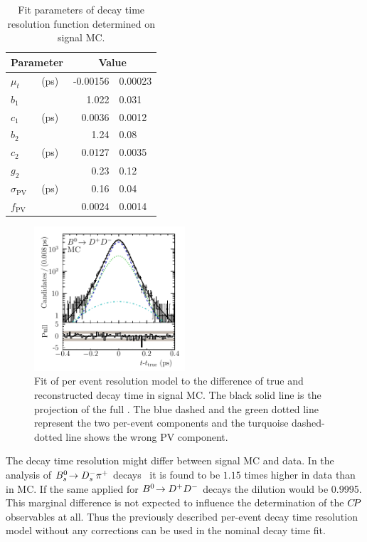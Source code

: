 \begin{table}[!htb]
\centering
\caption{Fit parameters of decay time resolution function determined on \BdToDD signal MC.}
  \begin{tabular}{llr@{$\,\pm\,$}l}
    \toprule
    \multicolumn{2}{c}{Parameter}       &   \multicolumn{2}{c}{Value} \\
    \midrule
    $\mu_t$             &   (\si{\ps})  &   -0.00156    &   0.00023               \\
    $b_{1}$             &               &   1.022       &   0.031                 \\
    $c_{1}$             &   (\si{\ps})  &   0.0036      &   0.0012                \\
    $b_{2}$             &               &   1.24        &   0.08                  \\
    $c_{2}$             &   (\si{\ps})  &   0.0127      &   0.0035                \\
    $g_{2}$             &               &   0.23        &   0.12                  \\
    $\sigma_\text{PV}$  &   (\si{\ps})  &   0.16        &   0.04                  \\
    $f_\text{PV}$       &               &   0.0024      &   0.0014                \\
    \bottomrule
  \end{tabular}
\label{tab:b02dd:decaytimefit:resolution}
\end{table}
%
\begin{figure}[!htb]
\centering
\includegraphics[width=0.5\textwidth]{07-B02DD/tikz/pdf/obsTimeErr_True_pull_logy.pdf}
\caption{Fit of per event resolution model to the difference of true and
reconstructed decay time in signal MC. The black solid line is the projection of the full
\PDF. The blue dashed and the green dotted line represent the two per-event
components and the turquoise dashed-dotted line shows the wrong PV component.}
\label{fig:b02dd:decaytimefit:resolution}
\end{figure}
%
The decay time resolution might differ between signal MC and data. In the
analysis of ${{B}^0_{s}}\!\rightarrow {\ensuremath{{D}^-_{s}}}{\ensuremath{{\pi}^+}}$ decays~\cite{LHCb-ANA-2012-068} it is found to be
$\num{1.15}$ times higher in data than in MC. If the same applied for ${{B}^0}\!\rightarrow {\ensuremath{{D}^+}}{\ensuremath{{D}^-}}$
decays the dilution would be \num{0.9995}. This marginal difference is not expected
to influence the determination of the ${C\!P}$ observables at all. Thus the
previously described per-event decay time resolution model without any
corrections can be used in the nominal decay time fit.
